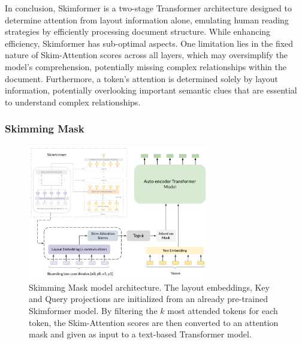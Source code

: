 In conclusion, Skimformer is a two-stage Transformer architecture designed to determine attention from layout information alone, emulating human reading strategies by efficiently processing document structure. While enhancing efficiency, Skimformer has sub-optimal aspects. One limitation lies in the fixed nature of Skim-Attention scores across all layers, which may oversimplify the model's comprehension, potentially missing complex relationships within the document. Furthermore, a token's attention is determined solely by layout information, potentially overlooking important semantic clues that are essential to understand complex relationships.

\subsubsection{Skimming Mask}

\begin{figure}
    \centering
    \includegraphics[width=0.7\textwidth]{images/chapter3/skimmingmask-architecture.pdf}
    \caption{Skimming Mask model architecture. The layout embeddings, Key and Query projections are initialized from an already pre-trained Skimformer model. By filtering the $k$ most attended tokens for each token, the Skim-Attention scores are then converted to an attention mask and given as input to a text-based Transformer model.}
    \label{fig:skimmingmask-architecture}
\end{figure}

